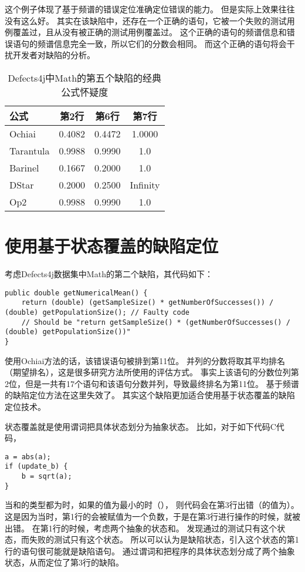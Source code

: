 这个例子体现了基于频谱的错误定位准确定位错误的能力。
但是实际上效果往往没有这么好。
其实在该缺陷中，还存在一个正确的语句，它被一个失败的测试用例覆盖过，且从没有被正确的测试用例覆盖过。
这个正确的语句的频谱信息和错误语句的频谱信息完全一致，所以它们的分数会相同。
而这个正确的语句将会干扰开发者对缺陷的分析。

\begin{table}
\centering
\begin{tabular}{|l|c|c|c|}
\hline
公式 & 第2行 & 第6行 & 第7行 \\
\hline
Ochiai & 0.4082 & 0.4472 & 1.0000 \\
\hline
Tarantula & 0.9988 & 0.9990 & 1.0 \\
\hline
Barinel & 0.1667 & 0.2000 & 1.0 \\
\hline
DStar & 0.2000 & 0.2500 & Infinity \\
\hline
Op2 & 0.9988 & 0.9990 & 1.0 \\
\hline
\end{tabular}
\caption{Defects4j中Math的第五个缺陷的经典公式怀疑度}
\label{math_5_susp}
\end{table}

\section{使用基于状态覆盖的缺陷定位}
\label{sec:state_based}

考虑Defects4j数据集中Math的第二个缺陷，其代码如下：
\lstset{language=Java}
\begin{lstlisting}
public double getNumericalMean() {
    return (double) (getSampleSize() * getNumberOfSuccesses()) / (double) getPopulationSize(); // Faulty code
    // Should be "return getSampleSize() * (getNumberOfSuccesses() / (double) getPopulationSize())"
}
\end{lstlisting}

使用Ochiai方法的话，该错误语句被排到第11位。
并列的分数将取其平均排名（期望排名），这是很多研究方法所使用的评估方式\parencite{Keller2017Evaluating,Xuan2014Learning,Steimann2013Threats,Wong2016A}。
事实上该语句的分数位列第2位，但是一共有17个语句和该语句分数并列，导致最终排名为第11位。
基于频谱的缺陷定位方法在这里失效了。
其实这个缺陷更加适合使用基于状态覆盖的缺陷定位技术。

状态覆盖就是使用谓词把具体状态划分为抽象状态。
比如，对于如下代码C代码，
\lstset{language=C}
\begin{lstlisting}
a = abs(a);
if (update_b) {
    b = sqrt(a);
}
\end{lstlisting}
当和的类型都为时，如果的值为最小的时（），
则代码会在第3行出错（的值为）。
这是因为当时，第1行的会被赋值为一个负数，于是在第3行进行操作的时候，就被出错。
在第1行的时候，考虑两个抽象的状态和。
发现通过的测试只有这个状态，而失败的测试只有这个状态。
所以可以认为是缺陷状态，引入这个状态的第1行的语句很可能就是缺陷语句。
通过谓词和把程序的具体状态划分成了两个抽象状态，从而定位了第3行的缺陷。

